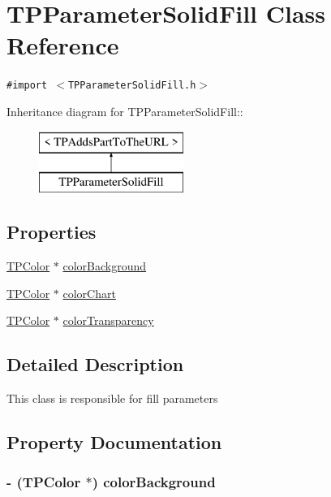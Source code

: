 \hypertarget{interface_t_p_parameter_solid_fill}{
\section{TPParameterSolidFill Class Reference}
\label{interface_t_p_parameter_solid_fill}
}
{\tt \#import $<$TPParameterSolidFill.h$>$}

Inheritance diagram for TPParameterSolidFill::\begin{figure}[H]
\begin{center}
\leavevmode
\includegraphics[height=2cm]{interface_t_p_parameter_solid_fill}
\end{center}
\end{figure}
\subsection*{Properties}
\begin{CompactItemize}
\item 
\hyperlink{interface_t_p_color}{TPColor} $\ast$ \hyperlink{interface_t_p_parameter_solid_fill_58ba085546fdaa3461a6579c0a79092b}{colorBackground}
\item 
\hyperlink{interface_t_p_color}{TPColor} $\ast$ \hyperlink{interface_t_p_parameter_solid_fill_9162639d5796e2e770862c5686781115}{colorChart}
\item 
\hyperlink{interface_t_p_color}{TPColor} $\ast$ \hyperlink{interface_t_p_parameter_solid_fill_dbcae233ca7541bcb0e8fca984a04c4e}{colorTransparency}
\end{CompactItemize}


\subsection{Detailed Description}
This class is responsible for fill parameters 

\subsection{Property Documentation}
\hypertarget{interface_t_p_parameter_solid_fill_58ba085546fdaa3461a6579c0a79092b}{
\subsubsection[{colorBackground}]{\setlength{\rightskip}{0pt plus 5cm}- ({\bf TPColor} $\ast$) colorBackground}}
\label{interface_t_p_parameter_solid_fill_58ba085546fdaa3461a6579c0a79092b}


